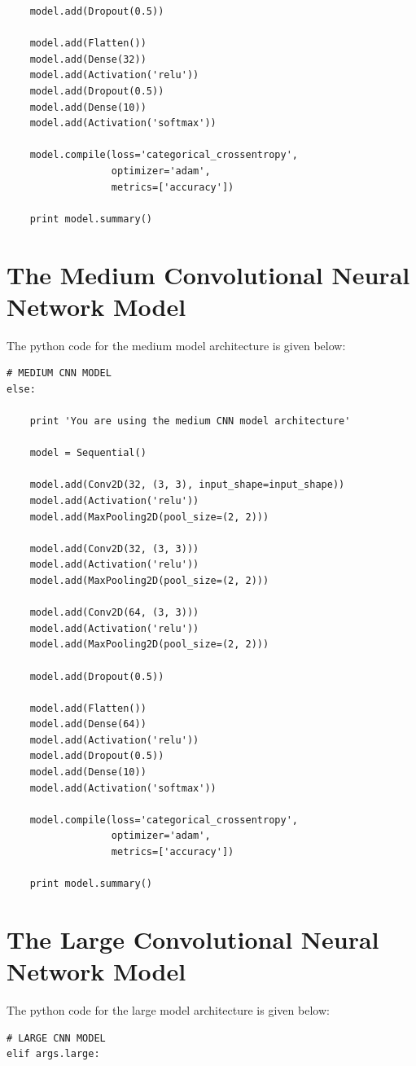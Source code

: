 \documentclass{l4proj}
\begin{document}
\begin{appendices}
\begin{lstlisting}
    model.add(Dropout(0.5))
    
    model.add(Flatten())
    model.add(Dense(32))
    model.add(Activation('relu'))
    model.add(Dropout(0.5))
    model.add(Dense(10))
    model.add(Activation('softmax'))
    
    model.compile(loss='categorical_crossentropy',
                  optimizer='adam',
                  metrics=['accuracy'])
    
    print model.summary()
\end{lstlisting}

\chapter{The Medium Convolutional Neural Network Model}
\label{appendix:MediumModel}
The python code for the medium model architecture is given below:
\begin{lstlisting}
# MEDIUM CNN MODEL
else:
    
    print 'You are using the medium CNN model architecture'
    
    model = Sequential()
    
    model.add(Conv2D(32, (3, 3), input_shape=input_shape))
    model.add(Activation('relu'))
    model.add(MaxPooling2D(pool_size=(2, 2)))
    
    model.add(Conv2D(32, (3, 3)))
    model.add(Activation('relu'))
    model.add(MaxPooling2D(pool_size=(2, 2)))
    
    model.add(Conv2D(64, (3, 3)))
    model.add(Activation('relu'))
    model.add(MaxPooling2D(pool_size=(2, 2)))
    
    model.add(Dropout(0.5))
    
    model.add(Flatten())
    model.add(Dense(64))
    model.add(Activation('relu'))
    model.add(Dropout(0.5))
    model.add(Dense(10))
    model.add(Activation('softmax'))
    
    model.compile(loss='categorical_crossentropy',
                  optimizer='adam',
                  metrics=['accuracy'])
    
    print model.summary()
\end{lstlisting}


\chapter{The Large Convolutional Neural Network Model}
\label{appendix:LargeModel}
The python code for the large model architecture is given below:
\begin{lstlisting}
# LARGE CNN MODEL
elif args.large:
    

\end{lstlisting}
\end{appendices}
\end{document}
